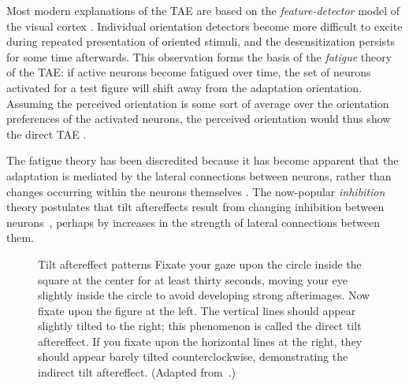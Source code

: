\documentclass[10pt]{article}   %
\begin{document}

Most modern explanations of the TAE are based on the {\em
  feature-detector\/} model of the visual cortex \cite{hubel:monkey}.
Individual orientation detectors become more difficult to excite
during repeated presentation of oriented stimuli, and the
desensitization persists for some time afterwards.  This observation
forms the basis of the {\em fatigue\/} theory of the TAE: if active
neurons become fatigued over time, the set of neurons activated for a
test figure will shift away from the adaptation orientation.  Assuming
the perceived orientation is some sort of average over the orientation
preferences of the activated neurons, the perceived orientation would
thus show the direct TAE \cite{coltheart:psyrev71}.

The fatigue theory has been discredited because it has become apparent
that the adaptation is mediated by the lateral connections between
neurons, rather than changes occurring within the neurons themselves
\cite{bednar:aitr97,vidyasagar:neurosci90}.  The now-popular {\em
  inhibition\/} theory postulates that tilt aftereffects result from
changing inhibition between neurons~\cite{tolhurst:vres75}, perhaps by
increases in the strength of lateral connections between them.

\begin{figure}
  \centering 
  {Tilt aftereffect patterns}
  {Fixate your gaze upon the circle inside the square at the center
    for at least thirty seconds, moving your eye slightly inside the
    circle to avoid developing strong afterimages.  Now fixate upon
    the figure at the left.  The vertical lines should appear slightly
    tilted to the right; this phenomenon is called the direct tilt
    aftereffect.  If you fixate upon the horizontal lines at the
    right, they should appear barely tilted counterclockwise, 
    demonstrating the indirect tilt aftereffect.
    (Adapted from~.)  
    }
\end{figure}
\end{document}

